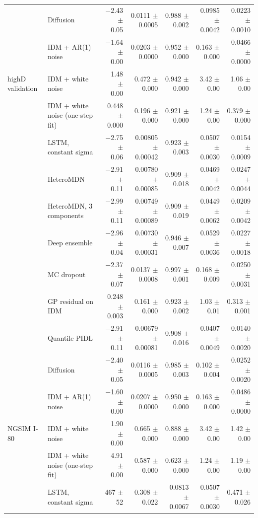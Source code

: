 \begin{longtable}{llrrrrr}
 & Diffusion & $-$2.43 $\pm$ 0.05 & 0.0111 $\pm$ 0.0005 & 0.988 $\pm$ 0.002 & 0.0985 $\pm$ 0.0042 & 0.0223 $\pm$ 0.0010 \\
 & IDM + AR(1) noise & $-$1.64 $\pm$ 0.00 & 0.0203 $\pm$ 0.0000 & 0.952 $\pm$ 0.000 & 0.163 $\pm$ 0.000 & 0.0466 $\pm$ 0.0000 \\
\midrule
highD validation & IDM + white noise & 1.48 $\pm$ 0.00 & 0.472 $\pm$ 0.000 & 0.942 $\pm$ 0.000 & 3.42 $\pm$ 0.00 & 1.06 $\pm$ 0.00 \\
 & IDM + white noise (one-step fit) & 0.448 $\pm$ 0.000 & 0.196 $\pm$ 0.000 & 0.921 $\pm$ 0.000 & 1.24 $\pm$ 0.00 & 0.379 $\pm$ 0.000 \\
 & LSTM, constant sigma & $-$2.75 $\pm$ 0.06 & 0.00805 $\pm$ 0.00042 & 0.923 $\pm$ 0.003 & 0.0507 $\pm$ 0.0030 & 0.0154 $\pm$ 0.0009 \\
 & HeteroMDN & $-$2.91 $\pm$ 0.11 & 0.00780 $\pm$ 0.00085 & 0.909 $\pm$ 0.018 & 0.0469 $\pm$ 0.0042 & 0.0247 $\pm$ 0.0044 \\
 & HeteroMDN, 3 components & $-$2.99 $\pm$ 0.11 & 0.00749 $\pm$ 0.00089 & 0.909 $\pm$ 0.019 & 0.0449 $\pm$ 0.0062 & 0.0209 $\pm$ 0.0042 \\
 & Deep ensemble & $-$2.96 $\pm$ 0.04 & 0.00730 $\pm$ 0.00031 & 0.946 $\pm$ 0.007 & 0.0529 $\pm$ 0.0036 & 0.0227 $\pm$ 0.0018 \\
 & MC dropout & $-$2.37 $\pm$ 0.07 & 0.0137 $\pm$ 0.0008 & 0.997 $\pm$ 0.001 & 0.168 $\pm$ 0.009 & 0.0250 $\pm$ 0.0031 \\
 & GP residual on IDM & 0.248 $\pm$ 0.003 & 0.161 $\pm$ 0.000 & 0.923 $\pm$ 0.002 & 1.03 $\pm$ 0.01 & 0.313 $\pm$ 0.001 \\
 & Quantile PIDL & $-$2.91 $\pm$ 0.11 & 0.00679 $\pm$ 0.00081 & 0.908 $\pm$ 0.016 & 0.0407 $\pm$ 0.0049 & 0.0140 $\pm$ 0.0020 \\
 & Diffusion & $-$2.40 $\pm$ 0.05 & 0.0116 $\pm$ 0.0005 & 0.985 $\pm$ 0.003 & 0.102 $\pm$ 0.004 & 0.0252 $\pm$ 0.0020 \\
 & IDM + AR(1) noise & $-$1.60 $\pm$ 0.00 & 0.0207 $\pm$ 0.0000 & 0.950 $\pm$ 0.000 & 0.163 $\pm$ 0.000 & 0.0486 $\pm$ 0.0000 \\
\midrule
NGSIM I-80 & IDM + white noise & 1.90 $\pm$ 0.00 & 0.665 $\pm$ 0.000 & 0.888 $\pm$ 0.000 & 3.42 $\pm$ 0.00 & 1.42 $\pm$ 0.00 \\
 & IDM + white noise (one-step fit) & 4.91 $\pm$ 0.00 & 0.587 $\pm$ 0.000 & 0.623 $\pm$ 0.000 & 1.24 $\pm$ 0.00 & 1.19 $\pm$ 0.00 \\
 & LSTM, constant sigma & 467 $\pm$ 52 & 0.308 $\pm$ 0.022 & 0.0813 $\pm$ 0.0067 & 0.0507 $\pm$ 0.0030 & 0.471 $\pm$ 0.026 \\

\end{longtable}
